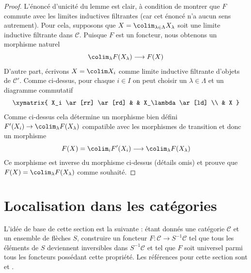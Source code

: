 \begin{proof}
\medskip\noindent
L'énoncé d'unicité du lemme est clair, à condition de montrer que
$F$ commute avec les limites inductives filtrantes (car cet énoncé n'a
aucun sens autrement). Pour cela, supposons que $X = \colim_{\lambda \in \Lambda} X_\lambda$ soit une limite inductive filtrante dans $\mathcal{C}$. Puisque
$F$ est un foncteur, nous obtenons un morphisme naturel
$$
\colim_\lambda F(X_\lambda) \longrightarrow F(X)
$$
D'autre part, écrivons $X = \colim X_i$ comme limite inductive filtrante d'objets de
$\mathcal{C}'$. Comme ci-dessus, pour chaque $i \in I$ on peut choisir un
$\lambda \in \Lambda$ et un diagramme commutatif
$$
\xymatrix{
X_i \ar[rr] \ar[rd] & & X_\lambda \ar[ld] \\
& X
}
$$
Comme ci-dessus cela détermine un morphisme bien défini $F'(X_i) \to \colim_\lambda F(X_\lambda)$ compatible avec les morphismes de transition et
donc un morphisme
$$
F(X) = \colim_i F'(X_i) \longrightarrow \colim_\lambda F(X_\lambda)
$$
Ce morphisme est inverse du morphisme ci-dessus (détails omis) et prouve que
$F(X) = \colim_\lambda F(X_\lambda)$ comme souhaité.
\end{proof}







\section{Localisation dans les catégories}
\label{section-localization}

\noindent
L'idée de base de cette section est la suivante : étant donnés une catégorie $\mathcal{C}$ et
un ensemble de flèches $S$, construire un foncteur $F : \mathcal{C} \to S^{-1}\mathcal{C}$ tel que tous les éléments de $S$ deviennent inversibles
dans $S^{-1}\mathcal{C}$ et tel que $F$ soit universel parmi tous les foncteurs
possédant cette propriété. Les références pour cette section sont
\cite[chapitre I, section 2]{GZ} et \cite[chapitre II, section 2]{Verdier}.

